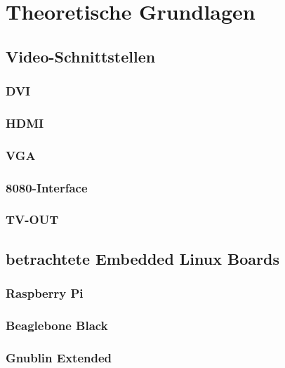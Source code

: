 \chapter{Theoretische Grundlagen}
\label{cha:Grundlagen}

\section{Video-Schnittstellen}
\subsection{DVI}
\subsection{HDMI}
\subsection{VGA}
\subsection{8080-Interface}
\subsection{TV-OUT}

\section{betrachtete Embedded Linux Boards}
\subsection{Raspberry Pi}
\subsection{Beaglebone Black}
\subsection{Gnublin Extended}

